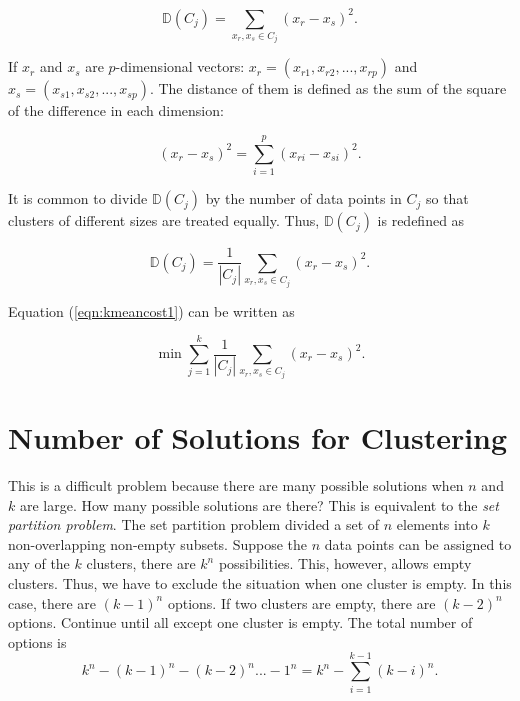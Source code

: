 \begin{equation}
\mathds{D}(C_j) = \underset{x_r, x_s \in C_j}{\sum} (x_r - x_s)^ 2.
\end{equation}

If $x_r$ and $x_s$ are $p$-dimensional vectors:
$x_r = (x_{r1}, x_{r2}, ..., x_{rp})$ and
$x_s = (x_{s1}, x_{s2}, ..., x_{sp})$.
The distance of them is defined as the sum of the square
of the difference in each dimension:

\begin{equation}
(x_r - x_s)^ 2 = \underset{i = 1}{\overset{p}{\sum}} (x_{ri} - x_{si})^2.
\end{equation}

It is common to divide $\mathds{D}(C_j)$ by the number of data points
in $C_j$ so that clusters of different sizes
are treated equally. Thus, $\mathds{D}(C_j)$ is redefined as

\begin{equation}
\mathds{D}(C_j) = \frac{1}{|C_j|} \underset{x_r, x_s \in C_j}{\sum} (x_r - x_s)^ 2.
\end{equation}

Equation (\ref{eqn:kmeancost1}) can be written as

\begin{equation}
\min \underset{j = 1}{\overset{k}{\sum}}  \frac{1}{|C_j|} \underset{x_r, x_s \in C_j}{\sum} (x_r - x_s)^ 2.
\end{equation}


\section{Number of Solutions for Clustering}

This is a difficult problem because there are many possible solutions
when $n$ and $k$ are large. How many possible solutions are there?
This is equivalent to the {\it set partition problem}.  The set
partition problem divided a set of $n$ elements into $k$
non-overlapping non-empty subsets.    Suppose the
$n$ data points can be assigned to any of the $k$ clusters, there are
$k^n$ possibilities.  This, however, allows empty clusters.
Thus, we have to exclude the situation when one 
cluster is empty. In this case, there are $(k-1)^n$ options.
If two clusters are empty, there are $(k-2)^n$ options.
Continue until all except one cluster is empty. The total number of
options is
\begin{equation}
k^n - (k-1)^n - (k -2) ^ n ... - 1^n = k^n - \underset{i = 1}{\overset{k-1} \sum} (k-i)^n.
\end{equation}  

